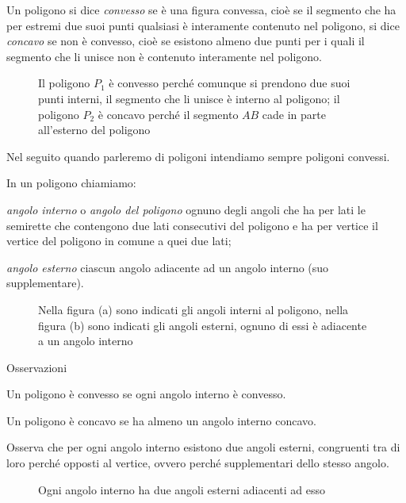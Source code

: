 \begin{definizione}
Un poligono si dice \emph{convesso} se è una figura convessa, cioè se il segmento che ha per estremi due suoi punti qualsiasi è interamente contenuto nel poligono, si dice \emph{concavo} se non è convesso, cioè se esistono almeno due punti per i quali il segmento che li unisce non è contenuto interamente nel poligono.
\end{definizione}

\begin{figure}[htb]
\centering
\caption{Il poligono $P_1$ è convesso perché comunque si prendono due suoi punti interni, il segmento che li unisce è interno al poligono; il poligono $P_2$ è concavo perché il segmento $AB$ cade in parte all'esterno del poligono}
\end{figure}

Nel seguito quando parleremo di poligoni intendiamo sempre poligoni convessi.

In un poligono chiamiamo:
\begin{itemize*}
\item \emph{angolo interno} o \emph{angolo del poligono} ognuno degli angoli che ha per lati le semirette che contengono due lati consecutivi del poligono e ha per vertice il vertice del poligono in comune a quei due lati;
\item \emph{angolo esterno} ciascun angolo adiacente ad un angolo interno (suo supplementare).
\end{itemize*}

\begin{figure}[htb]
\centering
\caption{Nella figura (a) sono indicati gli angoli interni al poligono, nella figura (b) sono indicati gli angoli esterni, ognuno di essi è adiacente a un angolo interno}
\end{figure}

Osservazioni
\begin{itemize*}
\item Un poligono è convesso se ogni angolo interno è convesso.
\item Un poligono è concavo se ha almeno un angolo interno concavo.
\end{itemize*}

Osserva che per ogni angolo interno esistono due angoli esterni, congruenti tra di loro perché opposti al vertice, ovvero perché supplementari dello stesso angolo.

\begin{figure}[htb]
\centering
\caption{Ogni angolo interno ha due angoli esterni adiacenti ad esso}
\end{figure}

